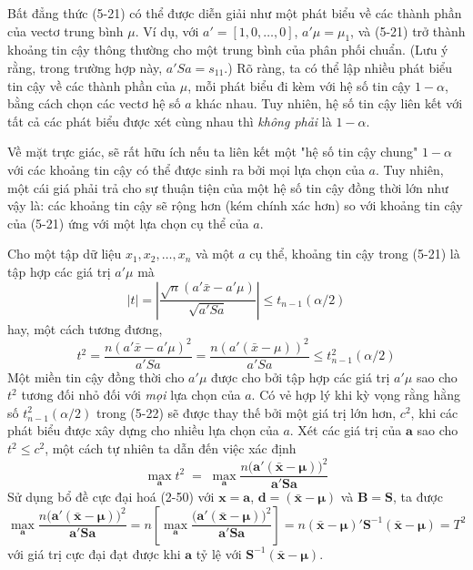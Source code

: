 Bất đẳng thức (5-21) có thể được diễn giải như một phát biểu về các thành phần của vectơ trung bình $\mu$. Ví dụ, với $a' = [1, 0, \dots, 0]$, $a'\mu = \mu_1$, và (5-21) trở thành khoảng tin cậy thông thường cho một trung bình của phân phối chuẩn. (Lưu ý rằng, trong trường hợp này, $a'Sa = s_{11}$.) Rõ ràng, ta có thể lập nhiều phát biểu tin cậy về các thành phần của $\mu$, mỗi phát biểu đi kèm với hệ số tin cậy $1 - \alpha$, bằng cách chọn các vectơ hệ số $a$ khác nhau. Tuy nhiên, hệ số tin cậy liên kết với tất cả các phát biểu được xét cùng nhau thì \textit{không phải} là $1 - \alpha$.

Về mặt trực giác, sẽ rất hữu ích nếu ta liên kết một "hệ số tin cậy chung" $1 - \alpha$ với các khoảng tin cậy có thể được sinh ra bởi mọi lựa chọn của $a$. Tuy nhiên, một cái giá phải trả cho sự thuận tiện của một hệ số tin cậy đồng thời lớn như vậy là: các khoảng tin cậy sẽ rộng hơn (kém chính xác hơn) so với khoảng tin cậy của (5-21) ứng với một lựa chọn cụ thể của $a$.

Cho một tập dữ liệu $x_1, x_2, \dots, x_n$ và một $a$ cụ thể, khoảng tin cậy trong (5-21) là tập hợp các giá trị $a'\mu$ mà
\begin{equation*}
|t| = \left| \frac{\sqrt{n}(a'\bar{x} - a'\mu)}{\sqrt{a'Sa}} \right| \le t_{n-1}(\alpha/2)
\end{equation*}
hay, một cách tương đương,
\begin{equation}
t^2 = \frac{n(a'\bar{x} - a'\mu)^2}{a'Sa} = \frac{n(a'(\bar{x} - \mu))^2}{a'Sa} \le t_{n-1}^2(\alpha/2) \tag{5-22}
\end{equation}
Một miền tin cậy đồng thời cho $a'\mu$ được cho bởi tập hợp các giá trị $a'\mu$ sao cho $t^2$ tương đối nhỏ đối với \textit{mọi} lựa chọn của $a$. Có vẻ hợp lý khi kỳ vọng rằng hằng số $t_{n-1}^2(\alpha/2)$ trong (5-22) sẽ được thay thế bởi một giá trị lớn hơn, $c^2$, khi các phát biểu được xây dựng cho nhiều lựa chọn của $a$.
\noindent Xét các giá trị của $\mathbf{a}$ sao cho $t^2 \le c^2$, một cách tự nhiên ta dẫn đến việc xác định
\[
  \max_{\mathbf{a}} t^2 \;=\; \max_{\mathbf{a}}\frac{n\bigl(\mathbf{a}'(\bar{\mathbf{x}}-\boldsymbol{\mu})\bigr)^2}{\mathbf{a}'\mathbf{S}\mathbf{a}}
\]
Sử dụng bổ đề cực đại hoá (2-50) với $\mathbf{x}=\mathbf{a}$, $\mathbf{d}=(\bar{\mathbf{x}}-\boldsymbol{\mu})$ và $\mathbf{B}=\mathbf{S}$, ta được
\begin{equation}\tag{5-23}
  \max_{\mathbf{a}}\frac{n\bigl(\mathbf{a}'(\bar{\mathbf{x}}-\boldsymbol{\mu})\bigr)^2}{\mathbf{a}'\mathbf{S}\mathbf{a}}
  = n\left[\max_{\mathbf{a}}\frac{\bigl(\mathbf{a}'(\bar{\mathbf{x}}-\boldsymbol{\mu})\bigr)^2}{\mathbf{a}'\mathbf{S}\mathbf{a}}\right]
  = n(\bar{\mathbf{x}}-\boldsymbol{\mu})'\mathbf{S}^{-1}(\bar{\mathbf{x}}-\boldsymbol{\mu}) = T^2
\end{equation}
với giá trị cực đại đạt được khi $\mathbf{a}$ tỷ lệ với $\mathbf{S}^{-1}(\bar{\mathbf{x}}-\boldsymbol{\mu})$.
 
